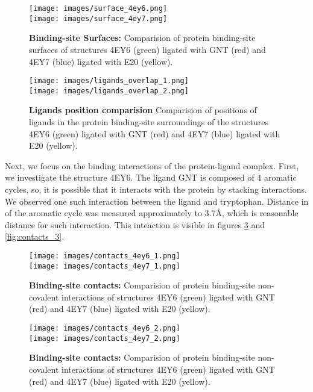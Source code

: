 \documentclass[10pt,a4paper,twocolumn]{article}
\begin{document}
\begin{figure}[tb]
    \centering
    \texttt{[image: images/surface\_4ey6.png]}
    \\[\smallskipamount]
    \texttt{[image: images/surface\_4ey7.png]}
    \caption{\textbf{Binding-site Surfaces:} 
    Comparision of protein binding-site surfaces of structures 4EY6 (green) 
    ligated with GNT (red) and 4EY7 (blue) ligated with E20 (yellow).}
    \label{fig:surfaces}
\end{figure} 


\begin{figure}[tb]
    \centering
    \texttt{[image: images/ligands\_overlap\_1.png]}
    \\[\smallskipamount]
    \texttt{[image: images/ligands\_overlap\_2.png]}
    \caption{\textbf{Ligands position comparision} 
    Comparision of positions of ligands in the protein binding-site 
    surroundings of the structures 4EY6 (green) ligated with GNT (red) 
    and 4EY7 (blue) ligated with E20 (yellow).}
    \label{fig:ligands_overlap}
\end{figure} 


Next, we focus on the binding interactions of the protein-ligand 
complex. First, we investigate the structure 4EY6. The ligand GNT
is composed of 4 aromatic cycles, so, it is possible that it interacts
with the protein by stacking interactions. We observed one such
interaction between the ligand and tryptophan. Distance in of the 
aromatic cycle was measured approximately to 3.7\AA, which is 
reasonable distance for such interaction. This inteaction is visible
in figures \ref{fig:contacts_1} and \ref{fig:contacts_3}.

\begin{figure}[tb]
    \centering
    \texttt{[image: images/contacts\_4ey6\_1.png]}
    \\[\smallskipamount]
    \texttt{[image: images/contacts\_4ey7\_1.png]}
    \caption{\textbf{Binding-site contacts:} 
    Comparision of protein binding-site non-covalent interactions 
    of structures 4EY6 (green) ligated with GNT (red) and 
    4EY7 (blue) ligated with E20 (yellow).}
    \label{fig:contacts_1}
\end{figure} 

\begin{figure}[tb]
    \centering
    \texttt{[image: images/contacts\_4ey6\_2.png]}
    \\[\smallskipamount]
    \texttt{[image: images/contacts\_4ey7\_2.png]}
    \caption{\textbf{Binding-site contacts:} 
    Comparision of protein binding-site non-covalent interactions 
    of structures 4EY6 (green) ligated with GNT (red) and 
    4EY7 (blue) ligated with E20 (yellow).}
    \label{fig:contacts_2}
\end{figure} 
\end{document}

